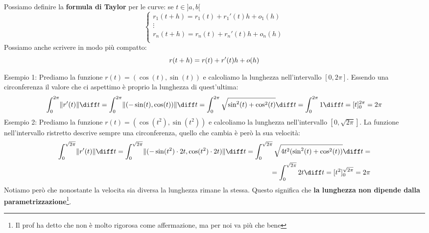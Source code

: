 
Possiamo definire la \textbf{formula di Taylor} per le curve: se $t \in ]a, b[$
\begin{equation*}
	\begin{cases}
		r_1(t + h) = r_1(t) + r_1'(t)h + o_1(h)\\
		\vdots\\
		r_n(t + h) = r_n(t) + r_n'(t)h + o_n(h)\\
	\end{cases}
\end{equation*}
Possiamo anche scrivere in modo più compatto:
\begin{equation*}
	r(t + h) = r(t) + r'(t)h + o(h)\\
\end{equation*}

Esempio 1: Prediamo la funzione $r(t) = (\cos(t), \sin(t))$ e calcoliamo la 
lunghezza nell'intervallo $[0, 2\pi]$. Essendo una circonferenza il valore che 
ci aspettimo è proprio la lunghezza di quest'ultima:
\begin{equation*}
	\int_0^{2\pi} \lVert r'(t) \rVert \diff t = \int_0^{2\pi} \lVert (
	-\sin(t), \cos(t)) \rVert \diff t = \int_0^{2\pi} \sqrt{\sin^2(t) + 
	\cos^2(t)} \diff t = \int_0^{2\pi} 1 \diff t =  [t]_0^{2\pi} = 2\pi
\end{equation*}
Esempio 2: Prediamo la funzione $r(t) = (\cos(t^2), \sin(t^2))$ e calcoliamo 
la lunghezza nell'intervallo $[0, \sqrt{2\pi}]$. La funzione nell'intervallo 
ristretto descrive sempre una circonferenza, quello che cambia è però la sua 
velocità:
\begin{align*}
	\int_0^{\sqrt{2\pi}} \lVert r'(t) \rVert \diff t = \int_0^{\sqrt{2\pi}} 
	\lVert (-\sin(t^2) \cdot 2t, \cos(t^2) \cdot 2t) \rVert \diff t = 
	\int_0^{\sqrt{2\pi}} \sqrt{4t^2(\sin^2(t) + \cos^2(t))} \diff t = \\
	= \int_0^{\sqrt{2\pi}} 2t \diff t =  [t^2]_0^{\sqrt{2\pi}} = 2\pi
\end{align*}
Notiamo però che nonostante la velocita sia diversa la lunghezza rimane la 
stessa. Questo significa che \textbf{la lunghezza non dipende dalla 
parametrizzazione}\footnote{Il prof ha detto che non è molto rigorosa come 
affermazione, ma per noi va più che bene}.

